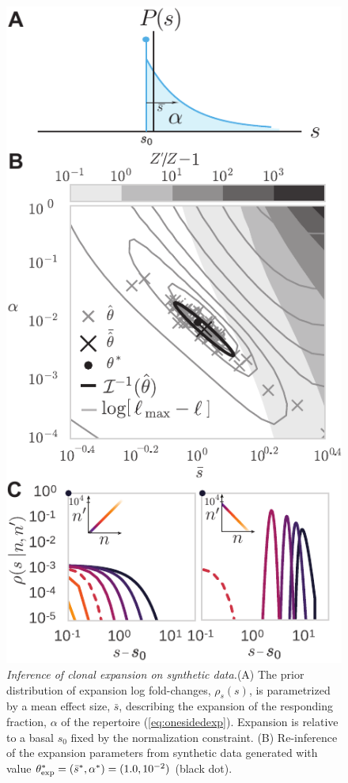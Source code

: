 \begin{figure}
\includegraphics{fig5_diffexpr_eval}
\centering{}
\caption{
\emph{Inference of clonal expansion on synthetic data.}(A) The prior distribution of expansion log fold-changes, $\rho_s(s)$, is parametrized by a mean effect size, $\bar{s}$, describing the expansion of the responding fraction, $\alpha$ of the repertoire  (\cref{eq:onesidedexp}). 
Expansion is relative to a basal $s_0$ fixed by the normalization constraint.
(B) Re-inference of the expansion parameters from synthetic data generated with value $\theta_{\rm exp}^*=(\bar{s}^*,\alpha^* )=(1.0,10^{-2})$ (black dot). 
}
\end{figure}

